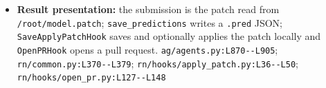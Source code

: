 \begin{itemize}
\item \textbf{Result presentation:} the submission is the patch read from \texttt{/\allowbreak{}root/\allowbreak{}model.\allowbreak{}patch}; \texttt{save\_\allowbreak{}predictions} writes a \texttt{.\allowbreak{}pred} JSON; \texttt{SaveApplyPatchHook} saves and optionally applies the patch locally and \texttt{OpenPRHook} opens a pull request. \texttt{ag/\allowbreak{}agents.\allowbreak{}py:\allowbreak{}L870-\allowbreak{}-\allowbreak{}L905}; \texttt{rn/\allowbreak{}common.\allowbreak{}py:\allowbreak{}L370-\allowbreak{}-\allowbreak{}L379}; \texttt{rn/\allowbreak{}hooks/\allowbreak{}apply\_\allowbreak{}patch.\allowbreak{}py:\allowbreak{}L36-\allowbreak{}-\allowbreak{}L50}; \texttt{rn/\allowbreak{}hooks/\allowbreak{}open\_\allowbreak{}pr.\allowbreak{}py:\allowbreak{}L127-\allowbreak{}-\allowbreak{}L148}
\end{itemize}

